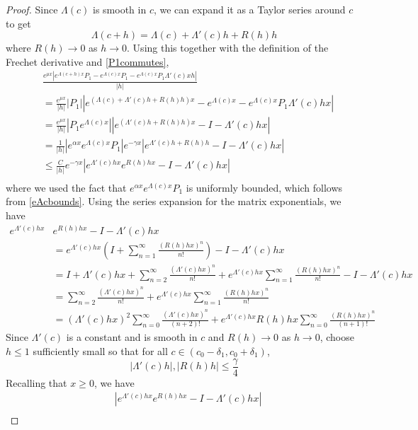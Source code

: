 \documentclass[thesis.tex]{subfiles}
\begin{document}
\begin{lemma}
\begin{proof}
Since $\Lambda(c)$ is smooth in $c$, we can expand it as a Taylor series around $c$ to get
\[
\Lambda(c+h) = \Lambda(c) + \Lambda'(c)h + R(h)h
\]
where $R(h) \rightarrow 0$ as $h \rightarrow 0$. Using this together with the definition of the Frechet derivative and \eqref{P1commutes},
\begin{align*}
&\frac{e^{\mu x} |e^{\Lambda(c+h)x}P_1 - e^{\Lambda(c)x}P_1 - e^{\Lambda(c)x} P_1 \Lambda'(c)x h|}{|h|} \\
&= \frac{e^{\mu x}}{|h|}| P_1|\left| e^{(\Lambda(c) + \Lambda'(c)h + R(h)h)x} - e^{\Lambda(c)x} - e^{\Lambda(c)x} P_1 \Lambda'(c)h x \right| \\
&= \frac{e^{\mu x}}{|h|}| P_1 e^{\Lambda(c)x}|\left| e^{(\Lambda'(c)h + R(h)h)x} - I - \Lambda'(c)h x \right| \\
&= \frac{1}{|h|} |e^{\alpha x} e^{\Lambda(c)x} P_1| e^{-\gamma x} \left| e^{\Lambda'(c)h + R(h)h} - I - \Lambda'(c)hx \right| \\
&\leq \frac{C}{|h|} e^{-\gamma x} \left| e^{\Lambda'(c)hx}e^{R(h)hx} - I - \Lambda'(c)hx \right| \\ 
\end{align*}
where we used the fact that $e^{\alpha x} e^{\Lambda(c)x} P_1$ is uniformly bounded, which follows from \eqref{eAcbounds}. Using the series expansion for the matrix exponentials, we have
\begin{align*}
e^{\Lambda'(c)hx}&e^{R(h)hx} - I - \Lambda'(c)hx \\
&= e^{\Lambda'(c)hx} \left(I + \sum_{n=1}^\infty \frac{(R(h)hx)^n}{n!} \right) - I - \Lambda'(c)hx \\
&= I + \Lambda'(c)hx + \sum_{n=2}^\infty \frac{(\Lambda'(c)hx)^n}{n!} + e^{\Lambda'(c)hx} \sum_{n=1}^\infty \frac{(R(h)hx)^n}{n!} - I - \Lambda'(c)hx \\
&= \sum_{n=2}^\infty \frac{(\Lambda'(c)hx)^n}{n!} + e^{\Lambda'(c)hx} \sum_{n=1}^\infty \frac{(R(h)hx)^n}{n!} \\
&= (\Lambda'(c)hx)^2 \sum_{n=0}^\infty \frac{(\Lambda'(c)hx)^n}{(n+2)!} + e^{\Lambda'(c)hx} R(h)hx \sum_{n=0}^\infty \frac{(R(h)hx)^n}{(n+1)!} 
\end{align*}
Since $\Lambda'(c)$ is a constant and is smooth in $c$ and $R(h) \rightarrow 0$ as $h \rightarrow 0$, choose $h \leq 1$ sufficiently small so that for all $c \in (c_0 - \delta_1, c_0 + \delta_1)$, 
\[
|\Lambda'(c)h|, |R(h)h| \leq \frac{\gamma}{4}
\]
Recalling that $x \geq 0$, we have
\begin{align*}
&\left| e^{\Lambda'(c)hx}e^{R(h)hx} - I - \Lambda'(c)hx \right| \\

\end{align*}
\end{proof}
\end{lemma}
\end{document}
